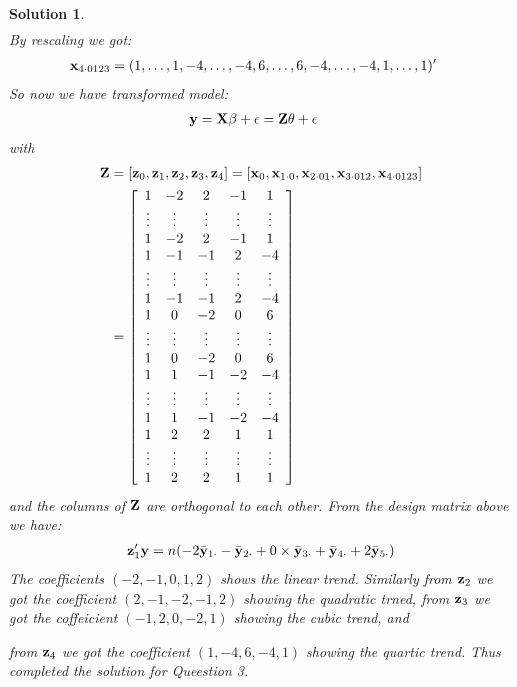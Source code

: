 \documentclass[11pt]{article}
\newtheorem{sol}{Solution}
\begin{document}
\begin{sol}
\begin{align*}
\end{align*}
By rescaling we got:
\begin{align*}
	{\bf x}_{4\cdot 0123} &= (1, \ldots, 1, -4, \ldots, -4, 6, \ldots, 6, -4, \ldots, -4, 1, \ldots, 1)'
\end{align*}
So now we have transformed model:
\begin{align*}
	{\bf y} &= {\bf X}{\bf \beta} + \epsilon = {\bf Z}{\bf \theta} + \epsilon
\end{align*}
with
\begin{align*}
	{\bf Z} &= \left[{\bf z}_0, {\bf z}_1, {\bf z}_2, {\bf z}_3, {\bf z}_4\right] = \left[{\bf x}_0, {\bf x}_{1\cdot 0}, {\bf x}_{2\cdot 01}, {\bf x}_{3\cdot 012}, {\bf x}_{4\cdot 0123}\right]\\
	&= \left[\begin{array}{ccccc} 1&-2&2&-1&1\\ \vdots&\vdots&\vdots&\vdots&\vdots \\
	1&-2&2&-1&1 \\ 
	1&-1&-1&2&-4 \\ \vdots&\vdots&\vdots&\vdots&\vdots \\
	1&-1&-1&2&-4 \\
	1&0&-2&0&6\\
	\vdots&\vdots&\vdots&\vdots&\vdots\\
	1&0&-2&0&6\\
	1&1&-1&-2&-4\\
	\vdots&\vdots&\vdots&\vdots&\vdots\\
	1&1&-1&-2&-4 \\
	1&2&2&1&1\\
	\vdots&\vdots&\vdots&\vdots&\vdots\\
	1&2&2&1&1\end{array}\right]
\end{align*}
and the columns of ${\bf Z}$ are orthogonal to each other.\vskip 2mm
From the design matrix above we have:
\begin{align*}
{\bf z}_1'{\bf y} = n(-2\bar{{\bf y}}_{1\cdot} - \bar{{\bf y}}_{2\cdot}+ 0\times \bar{{\bf y}}_{3\cdot} + \bar{{\bf y}}_{4\cdot} + 2\bar{{\bf y}}_{5\cdot})
\end{align*}
The coefficients $(-2, -1, 0, 1, 2)$ shows the linear trend.\vskip 2mm
Similarly from ${\bf z}_2$ we got the coefficient $(2, -1, -2, -1, 2)$ showing the quadratic trned, \vskip 2mm
from ${\bf z}_3$ we got the coffeicient $(-1, 2, 0, -2, 1)$ showing the cubic trend, and\vskip 2mm

from ${\bf z}_4$ we got the coefficient $(1, -4, 6, -4, 1)$ showing the quartic trend.\vskip 2mm
Thus completed the solution for Queestion 3.
\end{sol}
\end{document}
